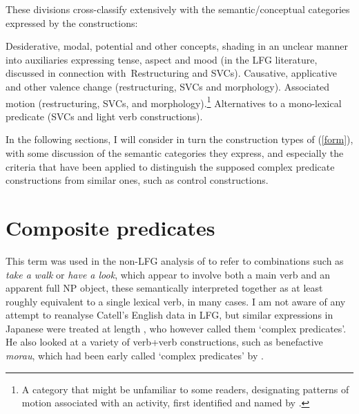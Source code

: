 \documentclass[output=paper,hidelinks]{langscibook}
\begin{document}
These divisions cross-classify extensively with the semantic/conceptual categories
expressed by the constructions:
\ea\label{meaning}
\begin{xlist}
\ex Desiderative, modal, potential and other concepts, shading in an
unclear manner into auxiliaries expressing tense, aspect and mood (in the LFG literature, discussed in connection with\
Restructuring and SVCs).
\ex Causative, applicative and other valence change (restructuring, SVCs and morphology).
\ex Associated motion (restructuring, SVCs, and morphology).\footnote
 {A category that might be unfamiliar to some readers, designating patterns of
  motion associated with an activity, first identified and named by \citet{Koch1984}.}
\ex Alternatives to a mono-lexical predicate (SVCs and light verb constructions).
\end{xlist}
\z

In the following sections, I will consider in turn the construction types
of (\ref{form}), with some discussion of the semantic categories they express, and 
especially the criteria that have been applied to distinguish
the supposed complex predicate constructions from similar ones, such as control
constructions.

\section{Composite predicates}
This term was used in the non-LFG analysis of \citet{Cattell1984} to refer to combinations such
as \emph{take a walk} or \emph{have a look}, which appear to involve both a main verb and an
apparent full NP object, these semantically interpreted together as at least roughly equivalent
to a single lexical verb, in many cases.  I am not aware of any attempt to reanalyse Catell's
English data in LFG, but similar expressions in Japanese were treated at length
\citep{Matsumoto1996}, who however called them `complex predicates'.  He also looked at a variety
of verb+verb constructions, such as benefactive \emph{morau}, which had been early called `complex
predicates' by \citet{Ishikawa1985}.
\end{document}
